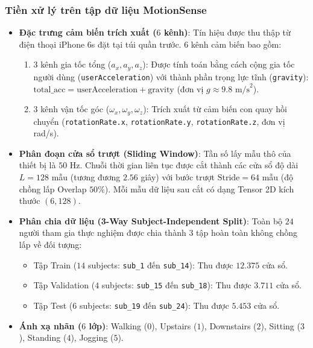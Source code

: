 \subsubsection{Tiền xử lý trên tập dữ liệu MotionSense}
\begin{itemize}
    \item \textbf{Đặc trưng cảm biến trích xuất ($6$ kênh)}: 
    Tín hiệu được thu thập từ điện thoại iPhone 6s đặt tại túi quần trước. $6$ kênh cảm biến bao gồm:
    \begin{enumerate}
        \item $3$ kênh gia tốc tổng ($a_x, a_y, a_z$): Được tính toán bằng cách cộng gia tốc người dùng (\texttt{userAcceleration}) với thành phần trọng lực tĩnh (\texttt{gravity}): 
        $\text{total\_acc} = \text{userAcceleration} + \text{gravity}$ (đơn vị $g \approx 9.8\text{ m/s}^2$).
        \item $3$ kênh vận tốc góc ($\omega_x, \omega_y, \omega_z$): Trích xuất từ cảm biến con quay hồi chuyển (\texttt{rotationRate.x}, \texttt{rotationRate.y}, \texttt{rotationRate.z}, đơn vị rad/s).
    \end{enumerate}
    \item \textbf{Phân đoạn cửa sổ trượt (Sliding Window)}: Tần số lấy mẫu thô của thiết bị là $50\text{ Hz}$. Chuỗi thời gian liên tục được cắt thành các cửa sổ độ dài $L = 128$ mẫu (tương đương $2.56$ giây) với bước trượt $\text{Stride} = 64$ mẫu (độ chồng lấp Overlap $50\%$). Mỗi mẫu dữ liệu sau cắt có dạng Tensor 2D kích thước $(6, 128)$.
    \item \textbf{Phân chia dữ liệu (3-Way Subject-Independent Split)}: Toàn bộ $24$ người tham gia thực nghiệm được chia thành 3 tập hoàn toàn không chồng lấp về đối tượng:
    \begin{itemize}
        \item Tập Train ($14$ subjects: \texttt{sub\_1} đến \texttt{sub\_14}): Thu được $12.375$ cửa sổ.
        \item Tập Validation ($4$ subjects: \texttt{sub\_15} đến \texttt{sub\_18}): Thu được $3.711$ cửa sổ.
        \item Tập Test ($6$ subjects: \texttt{sub\_19} đến \texttt{sub\_24}): Thu được $5.453$ cửa sổ.
    \end{itemize}
    \item \textbf{Ánh xạ nhãn ($6$ lớp)}: Walking ($0$), Upstairs ($1$), Downstairs ($2$), Sitting ($3$), Standing ($4$), Jogging ($5$).
\end{itemize}

